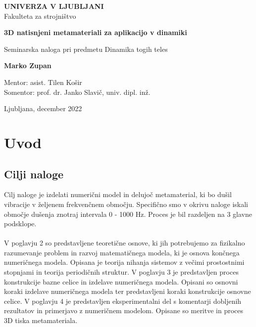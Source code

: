 \documentclass[12pt]{report}
\begin{document}
\pagestyle{fancy}
\renewcommand{\chaptermark}[1]{\markboth{#1}{}}

\fancyhf{}
\fancyhead[RO,LE]{\leftmark}
\fancyfoot[RO, LE]{\thepage}


\begin{titlepage}
    \begin{center}
        \textbf{UNIVERZA V LJUBLJANI}
        \\Fakulteta za strojništvo

        \vspace{5cm}
        \textbf{\Huge{3D natisnjeni metamateriali za aplikacijo v dinamiki}}

        \vspace{1cm}
        Seminarska naloga pri predmetu Dinamika togih teles

        \vspace{2cm}
        \textbf{\Large{Marko Zupan}}

        \vspace{4cm}
        Mentor: asist. Tilen Košir
        \\Somentor: prof. dr. Janko Slavič, univ. dipl. inž.

        \vspace{1.5cm}
        Ljubljana, december 2022


    \end{center}
    
\end{titlepage}

\tableofcontents

\printacronyms[name=Seznam okrajšav]

\chapter{Uvod}
\section{Cilji naloge}

Cilj naloge je izdelati numerični model in delujoč metamaterial, ki bo dušil vibracije
v željenem frekvenčnem območju. Specifično smo v okrivu naloge iskali območje dušenja
znotraj intervala 0 - 1000 Hz. Proces je bil razdeljen na 3 glavne podsklope.
\\
\\
V poglavju 2 so predstavljene teoretične osnove, ki jih potrebujemo za fizikalno razumevanje
problem in razvoj matematičnega modela, ki je osnova končnega numeričnega modela. Opisana je 
teorija nihanja sistemov z večimi prostostnimi stopnjami in teorija periodičnih struktur.
V poglavju 3 je predstavljen proces konstrukcije bazne celice in izdelave numeričnega modela. 
Opisani so osnovni koraki izdelave numeričnega modela ter predstavljeni koraki konstrukcije
osnovne celice.
V poglavju 4 je predstavljen eksperimentalni del s komentarji dobljenih rezultatov in primerjavo
z numeričnem modelom. Opisane so meritve in proces 3D tiska metamateriala.
\end{document}
